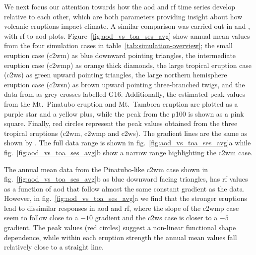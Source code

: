 \documentclass{ametsocV6.1}
\begin{document}
We next focus our attention towards how the \gls{aod} and \gls{rf} time series develop
relative to each other, which are both parameters providing insight about how volcanic
eruptions impact climate. A similar comparison was carried out in \citet[][their Fig.\
  4]{gregory2016} and \citet[][their Fig.\ 1]{marshall2020}, with \gls{rf} to \gls{aod}
plots. Figure~\ref{fig:aod_vs_toa_ses_avg} show annual mean values from the four
simulation cases in table~\ref{tab:simulation-overview}; the small eruption case
(\gls{c2wm}) as blue downward pointing triangles, the intermediate eruption case
(\gls{c2wmp}) as orange thick diamonds, the large tropical eruption case (\gls{c2ws}) as
green upward pointing triangles, the large northern hemisphere eruption case
(\gls{c2wsn}) as brown upward pointing three-branched twigs, and the data from
\citet[][Fig.\ 4, black crosses from HadCM3 sstPiHistVol]{gregory2016} as grey crosses
labelled G16. Additionally, the estimated peak values from the Mt.\ Pinatubo eruption
and Mt.\ Tambora eruption are plotted as a purple star and a yellow plus, while the peak
from the \gls{p100} is shown as a pink square. Finally, red circles represent the peak
values obtained from the three tropical eruptions (\gls{c2wm}, \gls{c2wmp} and
\gls{c2ws}). The gradient lines are the same as shown by \citet{gregory2016}. The full
data range is shown in fig.~\ref{fig:aod_vs_toa_ses_avg}a while
fig.~\ref{fig:aod_vs_toa_ses_avg}b show a narrow range highlighting the \gls{c2wm} case.

The annual mean data from the Pinatubo-like \gls{c2wm} case shown in
fig.~\ref{fig:aod_vs_toa_ses_avg}b as blue downward facing triangles, has \gls{rf}
values as a function of \gls{aod} that follow almost the same constant gradient as the
\citet{gregory2016} data. However, in fig.~\ref{fig:aod_vs_toa_ses_avg}a we find that
the stronger eruptions lead to dissimilar responses in \gls{aod} and \gls{rf}, where the
slope of the \gls{c2wmp} case seem to follow close to a \(-10\) gradient and the
\gls{c2ws} case is closer to a \(-5\) gradient. The peak values (red circles) suggest a
non-linear functional shape dependence, while within each eruption strength the annual
mean values fall relatively close to a straight line.
\end{document}
